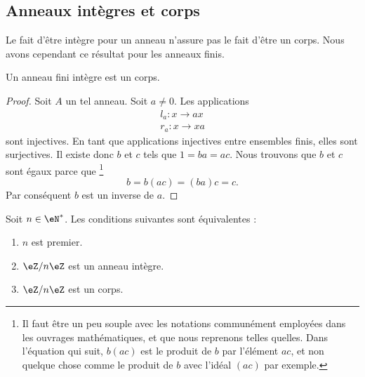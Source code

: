 \subsection{Anneaux intègres et corps}

Le fait d'être intègre pour un anneau n'assure pas le fait d'être un corps. Nous avons cependant ce résultat pour les anneaux finis.

\begin{proposition}     \label{PropanfinintimpCorp}
	Un anneau fini intègre est un corps.
\end{proposition}

\begin{proof}
	Soit \( A\) un tel anneau. Soit \( a\neq 0\). Les applications
	\begin{subequations}
		\begin{align}
			l_a\colon x\to ax \\
			r_a\colon x\to xa
		\end{align}
	\end{subequations}
	sont injectives. En tant que applications injectives entre ensembles finis, elles sont surjectives. Il existe donc \( b\) et \( c\) tels que \( 1=ba=ac\). Nous trouvons que \( b\) et \( c\) sont égaux parce que
	\footnote{Il faut être un peu souple avec les notations communément employées dans les ouvrages mathématiques, et que nous reprenons telles quelles. Dans l'équation qui suit, \( b(ac)\) est le produit de \( b\) par l'élément \( ac\), et non quelque chose comme le produit de \( b\) avec l'idéal \( (ac)\) par exemple.}
	\begin{equation}
		b=b(ac)=(ba)c=c.
	\end{equation}
	Par conséquent \( b\) est un inverse de \( a\).
\end{proof}

\begin{proposition}     \label{PropzhFgNJ}
	Soit \( n\in\eN^*\). Les conditions suivantes sont équivalentes :
	\begin{enumerate}
		\item
		      \( n\) est premier.
		\item
		      \( \eZ/n\eZ\) est un anneau intègre.
		\item
		      \( \eZ/n\eZ\) est un corps.
	\end{enumerate}
\end{proposition}

